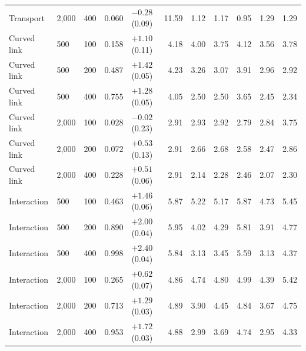 \begin{table}[p]
\begin{tabular}{llrrlrrrrrr}
Transport & 2,000 & 400 & 0.060 & $-0.28$ (0.09) & 11.59 & 1.12 & 1.17 & 0.95 & 1.29 & 1.29 \\
\addlinespace
Curved link & 500 & 100 & 0.158 & $+1.10$ (0.11) & 4.18 & 4.00 & 3.75 & 4.12 & 3.56 & 3.78 \\
Curved link & 500 & 200 & 0.487 & $+1.42$ (0.05) & 4.23 & 3.26 & 3.07 & 3.91 & 2.96 & 2.92 \\
Curved link & 500 & 400 & 0.755 & $+1.28$ (0.05) & 4.05 & 2.50 & 2.50 & 3.65 & 2.45 & 2.34 \\
Curved link & 2,000 & 100 & 0.028 & $-0.02$ (0.23) & 2.91 & 2.93 & 2.92 & 2.79 & 2.84 & 3.75 \\
Curved link & 2,000 & 200 & 0.072 & $+0.53$ (0.13) & 2.91 & 2.66 & 2.68 & 2.58 & 2.47 & 2.86 \\
Curved link & 2,000 & 400 & 0.228 & $+0.51$ (0.06) & 2.91 & 2.14 & 2.28 & 2.46 & 2.07 & 2.30 \\
\addlinespace
Interaction & 500 & 100 & 0.463 & $+1.46$ (0.06) & 5.87 & 5.22 & 5.17 & 5.87 & 4.73 & 5.45 \\
Interaction & 500 & 200 & 0.890 & $+2.00$ (0.04) & 5.95 & 4.02 & 4.29 & 5.81 & 3.91 & 4.77 \\
Interaction & 500 & 400 & 0.998 & $+2.40$ (0.04) & 5.84 & 3.13 & 3.45 & 5.59 & 3.13 & 4.37 \\
Interaction & 2,000 & 100 & 0.265 & $+0.62$ (0.07) & 4.86 & 4.74 & 4.80 & 4.99 & 4.39 & 5.42 \\
Interaction & 2,000 & 200 & 0.713 & $+1.29$ (0.03) & 4.89 & 3.90 & 4.45 & 4.84 & 3.67 & 4.75 \\
Interaction & 2,000 & 400 & 0.953 & $+1.72$ (0.03) & 4.88 & 2.99 & 3.69 & 4.74 & 2.95 & 4.33 \\
\bottomrule
\end{tabular}
\end{table}
